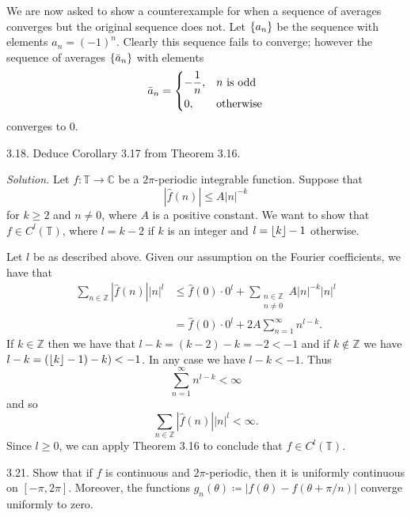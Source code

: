 \documentclass{article}
\DeclarePairedDelimiter\floor{\lfloor}{\rfloor}
\newcommand{\C}{\mathbb{C}}
\newcommand{\T}{\mathbb{T}}
\newcommand{\Z}{\mathbb{Z}}
\begin{document}
We are now asked to show a counterexample for when a sequence of
averages converges but the original sequence does not.
Let $\cbr{a_n}$ be the sequence with elements $a_n = (-1)^n$.
Clearly this sequence fails to converge; however the sequence of averages
$\cbr{\bar{a}_n}$ with elements
%
\begin{equation*}
    \bar{a}_n =
        \begin{dcases}
            -\frac{1}{n},& \text{$n$ is odd} \\
            0,& \text{otherwise}
        \end{dcases}
\end{equation*}
%
converges to $0$.

\newpage

3.18. Deduce Corollary 3.17 from Theorem 3.16.

\textit{Solution.}
Let $f: \T \to \C$ be a $2\pi$-periodic integrable function.
Suppose that
%
\begin{equation*}
    |\widehat{f}(n)| \leq A |n|^{-k}
\end{equation*}
%
for $k \geq 2$ and $n \neq 0$, where $A$ is a positive constant. We want
to show that $f \in C^l(\T)$, where $l = k - 2$ if $k$ is an integer and
$l = \floor{k} - 1$ otherwise.

Let $l$ be as described above. Given our assumption on the Fourier
coefficients, we have that
%
\begin{align*}
    \sum_{n \in \Z} |\widehat{f}(n)| |n|^l
        &\leq \widehat{f}(0) \cdot 0^l + \sum_{\substack{n \in \Z \\ n \neq 0}} A |n|^{-k} |n|^l \\
        &= \widehat{f}(0) \cdot 0^l + 2 A \sum_{n = 1}^\infty n^{l - k}
        .
\end{align*}
%
If $k \in \Z$ then we have that $l - k = (k - 2) - k = -2 < -1$ and if
$k \not\in \Z$ we have $l - k = (\floor{k} - 1) - k) < - 1$.
In any case we have $l - k < -1$. Thus
%
\begin{equation*}
    \sum_{n = 1}^\infty n^{l - k} < \infty
\end{equation*}
%
and so
%
\begin{equation*}
    \sum_{n \in \Z} |\widehat{f}(n)| |n|^l < \infty
    .
\end{equation*}
%
Since $l \geq 0$, we can apply Theorem 3.16 to conclude that
$f \in C^l(\T)$.

\newpage

3.21. Show that if $f$ is continuous and $2\pi$-periodic, then it is
  uniformly continuous on $[-\pi, 2 \pi]$. Moreover, the functions
  $g_n(\theta) \coloneqq |f(\theta) - f(\theta + \pi/n)|$ converge
  uniformly to zero.
\end{document}
